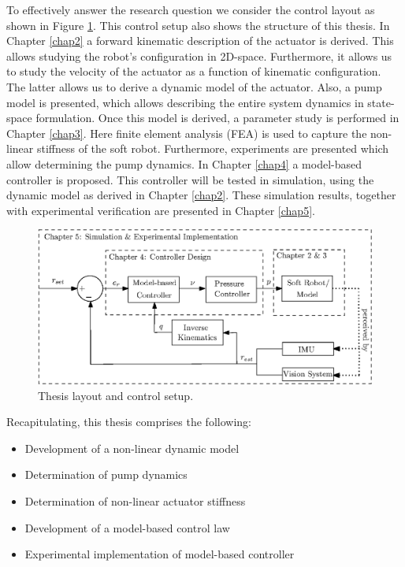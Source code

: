 To effectively answer the research question we consider the control layout as shown in Figure \ref{fig1:controlarchitecture}. This control setup also shows the structure of this thesis. In Chapter \ref{chap2} a forward kinematic description of the actuator is derived. This allows studying the robot's configuration in 2D-space. Furthermore, it allows us to study the velocity of the actuator as a function of kinematic configuration. The latter allows us to derive a dynamic model of the actuator. Also, a pump model is presented, which allows describing the entire system dynamics in state-space formulation. Once this model is derived, a parameter study is performed in Chapter \ref{chap3}. Here finite element analysis (FEA) is used to capture the non-linear stiffness of the soft robot. Furthermore, experiments are presented which allow determining the pump dynamics. In Chapter \ref{chap4} a model-based controller is proposed. This controller will be tested in simulation, using the dynamic model as derived in Chapter \ref{chap2}. These simulation results, together with experimental verification are presented in Chapter \ref{chap5}.




\begin{figure}[H]
    \centering
    \includegraphics[width = \textwidth]{Figures/Chapter1/controlschemeCompleteGood.eps}
    \caption{Thesis layout and control setup.}
    \label{fig1:controlarchitecture}
\end{figure}


Recapitulating, this thesis comprises the following:


\begin{itemize}
    \item Development of a non-linear dynamic model
    \item Determination of pump dynamics
    \item Determination of non-linear actuator stiffness
    \item Development of a model-based control law
    \item Experimental implementation of model-based controller
\end{itemize}


